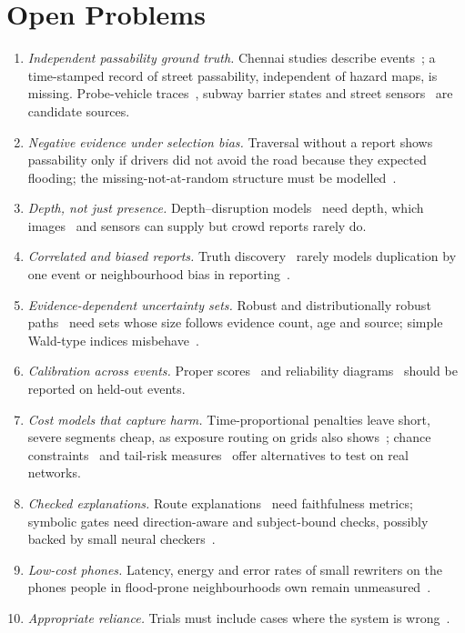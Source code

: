 \documentclass[journal]{IEEEtran}
\begin{document}
\section{Open Problems}\label{sec:open}
\begin{enumerate}
\item \emph{Independent passability ground truth.} Chennai studies describe events~\cite{radhakrishnan2024chennai,k2026monitoring}; a time-stamped record of street passability, independent of hazard maps, is missing. Probe-vehicle traces~\cite{hiramoto2025probe,pietrobon2019closure}, subway barrier states and street sensors~\cite{mydlarz2024floodnet} are candidate sources.
\item \emph{Negative evidence under selection bias.} Traversal without a report shows passability only if drivers did not avoid the road because they expected flooding; the missing-not-at-random structure must be modelled~\cite{agostini2024underreport}.
\item \emph{Depth, not just presence.} Depth--disruption models~\cite{pregnolato2017depth} need depth, which images~\cite{kharazi2021stopsign,song2021floodmask,zhong2024traffic} and sensors can supply but crowd reports rarely do.
\item \emph{Correlated and biased reports.} Truth discovery~\cite{dawid1979em,li2014crh} rarely models duplication by one event or neighbourhood bias in reporting~\cite{esparza2023imbalance,liu2024disparities}.
\item \emph{Evidence-dependent uncertainty sets.} Robust and distributionally robust paths~\cite{filippi2025survey,wang2020wdrsp} need sets whose size follows evidence count, age and source; simple Wald-type indices misbehave~\cite{brown2001interval}.
\item \emph{Calibration across events.} Proper scores~\cite{gneiting2007scoring} and reliability diagrams~\cite{degroot1983forecasters} should be reported on held-out events.
\item \emph{Cost models that capture harm.} Time-proportional penalties leave short, severe segments cheap, as exposure routing on grids also shows~\cite{wolf2025coolwalks}; chance constraints~\cite{charnes1959chance} and tail-risk measures~\cite{toumazis2013cvar,hakobyan2019cvar} offer alternatives to test on real networks.
\item \emph{Checked explanations.} Route explanations~\cite{schild2025route,alsheeb2023explainable} need faithfulness metrics; symbolic gates need direction-aware and subject-bound checks, possibly backed by small neural checkers~\cite{tang2024minicheck}.
\item \emph{Low-cost phones.} Latency, energy and error rates of small rewriters on the phones people in flood-prone neighbourhoods own remain unmeasured~\cite{laskaridis2024melt,xiao2024pockets}.
\item \emph{Appropriate reliance.} Trials must include cases where the system is wrong~\cite{lee2004trust,bansal2021whole}.
\end{enumerate}
\end{document}
